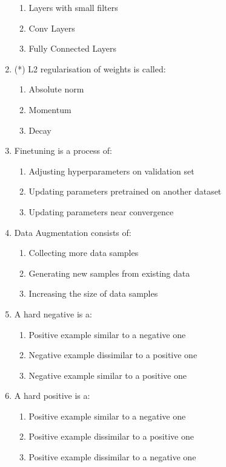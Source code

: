 \documentclass{report}
\numberwithin{equation}{section}
\begin{document}
\begin{enumerate}
\begin{enumerate}[label=\alph*.]
        \item Layers with small filters
        \item Conv Layers
        \item Fully Connected Layers
    \end{enumerate}
    \item (*) L2 regularisation of weights is called:
    \begin{enumerate}[label=\alph*.]
        \item Absolute norm
        \item Momentum
        \item Decay
    \end{enumerate}
    \item Finetuning is a process of:
    \begin{enumerate}[label=\alph*.]
        \item Adjusting hyperparameters on validation set
        \item Updating parameters pretrained on another dataset
        \item Updating parameters near convergence
    \end{enumerate}
    \item Data Augmentation consists of:
    \begin{enumerate}[label=\alph*.]
        \item Collecting more data samples
        \item Generating new samples from existing data
        \item Increasing the size of data samples
    \end{enumerate}
    \item A hard negative is a:
    \begin{enumerate}[label=\alph*.]
        \item Positive example similar to a negative one
        \item Negative example dissimilar to a positive one
        \item Negative example similar to a positive one
    \end{enumerate}
    \item A hard positive is a:
    \begin{enumerate}[label=\alph*.]
        \item Positive example similar to a negative one
        \item Positive example dissimilar to a positive one
        \item Positive example dissimilar to a negative one

\end{enumerate}
\end{enumerate}
\end{document}
